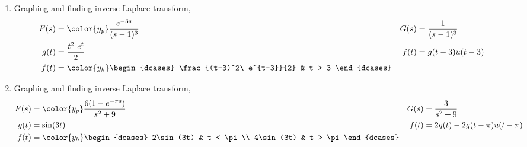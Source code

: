 \begin{enumerate}
    \item Graphing and finding inverse Laplace transform,
          \begin{align}
              F(s) & = \color{y_p} \frac{e^{-3s}} {(s-1)^3}                    &
              G(s) & = \frac{1}{(s-1)^3}                                                    \\
              g(t) & = \frac{t^2\ e^t}{2}                                      &
              f(t) & = g(t-3)u(t-3)                                                         \\
              f(t) & = \color{y_h} \begin{dcases}
                                       \frac{(t-3)^2\ e^{t-3}}{2} & t > 3
                                   \end{dcases}
          \end{align}

          \begin{figure}[H]
              \centering
          \end{figure}

    \item Graphing and finding inverse Laplace transform,
          \begin{align}
              F(s) & = \color{y_p} \frac{6(1 - e^{-\pi s})} {s^2 + 9} &
              G(s) & = \frac{3}{s^2 + 9}                                \\
              g(t) & = \sin(3t)                                       &
              f(t) & = 2g(t) - 2g(t-\pi)u(t- \pi)                       \\
              f(t) & = \color{y_h}
              \begin{dcases}
                  2\sin(3t) & t < \pi \\
                  4\sin(3t) & t > \pi
              \end{dcases}
          \end{align}


\end{enumerate}
